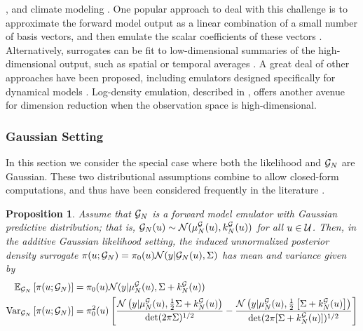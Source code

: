 \documentclass[12pt]{article}
\newtheorem{prop}{Proposition}
\begin{document}
\citep{emPostDens,DagonCLM}, and climate modeling \citep{ESM_modeling_2pt0,idealizedGCM}.
One popular approach to deal with this challenge is to approximate the forward model output
as a linear combination of a small number of basis vectors, and then emulate the scalar coefficients 
of these vectors \citep{HigdonBasis,FadikarAgentBased,PODemulation}. Alternatively, surrogates 
can be fit to low-dimensional summaries of the high-dimensional output, such as spatial or 
temporal averages \citep{ESM_modeling_2pt0,idealizedGCM,CLMBayesianCalibration,CLMSurrogates}.
A great deal of other approaches have been proposed, including emulators designed 
specifically for dynamical models \citep{GP_dynamic_emulation, Bayesian_emulation_dynamic, Liu_West_dynamic_emulation, dynamic_nonlinear_simulators_GP}.
Log-density emulation, described in , offers another avenue for 
dimension reduction when the observation space is high-dimensional.

\subsubsection{Gaussian Setting}
In this section we consider the special case where both the likelihood and $\fwdEm[\Ndesign]$ are Gaussian.
These two distributional assumptions combine to allow closed-form computations, and thus have 
been considered frequently in the literature \citep{StuartTeck1,GP_PDE_priors,hydrologicalModel,Surer2023sequential,VillaniAdaptiveGP,weightedIVAR,idealizedGCM,CES}.

\begin{prop} \label{prop:fwd-em-Gaussian}
Assume that $\fwdEm[\Ndesign]$ is a forward model emulator with Gaussian predictive distribution; 
that is, $\fwdEm[\Ndesign](\Par) \sim \Gaussian(\emMean[\Ndesign]{\fwd}(\Par), \emKer[\Ndesign]{\fwd}(\Par))$
for all $\Par \in \parSpace$. Then, in the additive Gaussian likelihood setting, the induced unnormalized 
posterior density surrogate 
$\postDens(\Par; \fwdEm[\Ndesign]) = \priorDens(\Par)\Gaussian(\obs| \fwdEm[\Ndesign](\Par), \likPar)$
has mean and variance given by
\begin{align*}
\E_{\fwdEm}\left[\postDens(\Par; \fwdEm[\Ndesign]) \right] 
&= \priorDens(\Par) \Gaussian(\obs | \emMean[\Ndesign]{\fwd}(\Par), \likPar + \emKer[\Ndesign]{\fwd}(\Par)) \\
\Var_{\fwdEm}\left[\postDens(\Par; \fwdEm[\Ndesign]) \right]
&= \priorDens^2(\Par) \left[\frac{\Gaussian\left(\obs | \emMean[\Ndesign]{\fwd}(\Par), \frac{1}{2}\likPar + \emKer[\Ndesign]{\fwd}(\Par)  \right)}{\det(2\pi \likPar)^{1/2}}
- \frac{\Gaussian\left(\obs | \emMean[\Ndesign]{\fwd}(\Par), \frac{1}{2}\left[\likPar + \emKer[\Ndesign]{\fwd}(\Par)\right]  \right)}{\det(2\pi [\likPar + \emKer[\Ndesign]{\fwd}(\Par)])^{1/2}}\right]
\end{align*}
\end{prop}
\end{document}
